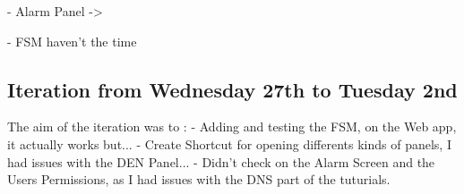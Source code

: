 \documentclass[a4paper, 10pt]{article}
\begin{document}
        - Alarm Panel -> 

        - FSM haven't the time

\subsection*{Iteration from Wednesday 27th to Tuesday 2nd}
The aim of the iteration was to :
    - Adding and testing the FSM, on the Web app, it actually works but...
    - Create Shortcut for opening differents kinds of panels, I had issues with the DEN Panel...
    - Didn't check on the Alarm Screen and the Users Permissions, as I had issues with the DNS part of the tuturials.

\normalsize
\end{document}
